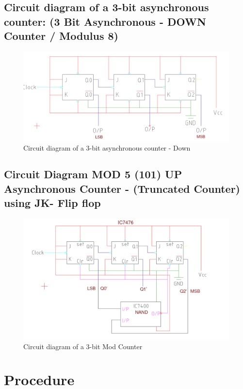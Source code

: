 \documentclass[11pt]{article}
\begin{document}
\subsection{Circuit diagram of a 3-bit asynchronous counter: (3 Bit Asynchronous - DOWN Counter / Modulus 8)}


\begin{figure}[H]
	\centering
	\includegraphics[scale = 0.45]{asynchronuos counter mod 8 down.png}
	\caption{Circuit diagram of a 3-bit asynchronous counter - Down}
\end{figure}
\subsection{Circuit Diagram MOD 5 (101) UP Asynchronous Counter - (Truncated Counter) using JK- Flip flop}

\begin{figure}[H]
	\centering
	\includegraphics[scale = 0.5]{mod 5 counter.png}
	\caption{Circuit diagram of a 3-bit Mod Counter}
\end{figure}

\section{Procedure}
\end{document}

